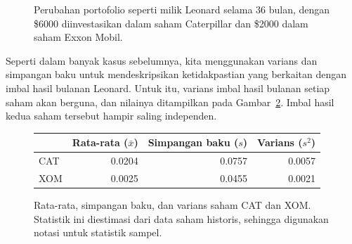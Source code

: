 \begin{figure}[ht]
\centering
{}
\caption{Perubahan portofolio seperti milik Leonard selama 36 bulan,
    dengan \$6000 diinvestasikan dalam saham Caterpillar dan \$2000 dalam
    saham Exxon Mobil.}
\label{changeInLeonardsStockPortfolioFor36Months}
\end{figure}

Seperti dalam banyak kasus sebelumnya,
kita menggunakan varians dan simpangan baku untuk mendeskripsikan
ketidakpastian yang berkaitan dengan imbal hasil bulanan Leonard.
Untuk itu, varians imbal hasil bulanan setiap saham
akan berguna, dan nilainya ditampilkan pada
Gambar~\ref{sumStatOfCATXOM}.
Imbal hasil kedua saham tersebut hampir saling independen.

\begin{figure}
\centering
\begin{tabular}{lrrr}
\hline
    & Rata-rata ($\bar{x}$) & Simpangan baku ($s$) &
	    Varians ($s^2$) \\
\hline
CAT & 0.0204  & 0.0757  & 0.0057 \\
XOM & 0.0025  & 0.0455  & 0.0021 \\
\hline
\end{tabular}
\caption{Rata-rata, simpangan baku, dan varians saham
    CAT dan XOM.
    Statistik ini diestimasi dari data saham
    historis, sehingga digunakan notasi untuk
    statistik sampel.}
\label{sumStatOfCATXOM}
\end{figure}


